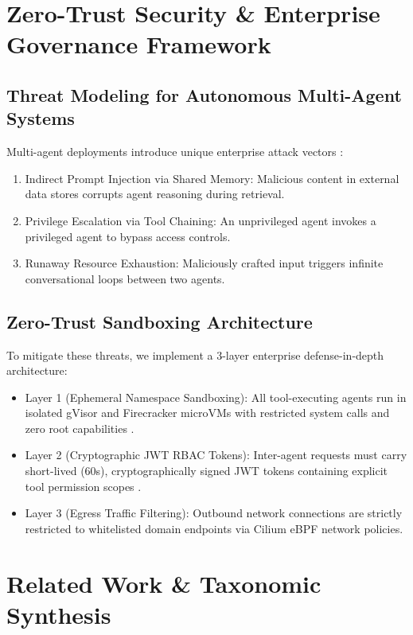 \documentclass[10pt,twocolumn,letterpaper]{article}
\begin{document}
\section{Zero-Trust Security \& Enterprise Governance Framework}



\subsection{Threat Modeling for Autonomous Multi-Agent Systems}


Multi-agent deployments introduce unique enterprise attack vectors \cite{arxiv_2404_04289}:
\begin{enumerate}
  \item Indirect Prompt Injection via Shared Memory: Malicious content in external data stores corrupts agent reasoning during retrieval.
  \item Privilege Escalation via Tool Chaining: An unprivileged agent invokes a privileged agent to bypass access controls.
  \item Runaway Resource Exhaustion: Maliciously crafted input triggers infinite conversational loops between two agents.
\end{enumerate}


\subsection{Zero-Trust Sandboxing Architecture}


To mitigate these threats, we implement a 3-layer enterprise defense-in-depth architecture:
\begin{itemize}
  \item Layer 1 (Ephemeral Namespace Sandboxing): All tool-executing agents run in isolated gVisor and Firecracker microVMs with restricted system calls and zero root capabilities \cite{doaj_001772c2113c476d9d5d40452c8e10e1}.
  \item Layer 2 (Cryptographic JWT RBAC Tokens): Inter-agent requests must carry short-lived (60s), cryptographically signed JWT tokens containing explicit tool permission scopes \cite{pubmed_42380865}.
  \item Layer 3 (Egress Traffic Filtering): Outbound network connections are strictly restricted to whitelisted domain endpoints via Cilium eBPF network policies.
\end{itemize}




\section{Related Work \& Taxonomic Synthesis}
\end{document}

